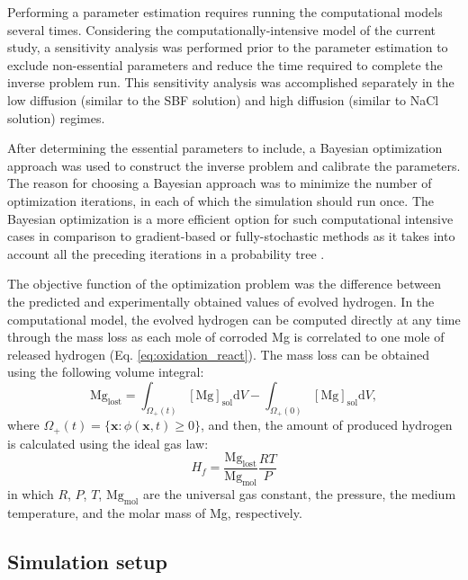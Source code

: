 Performing a parameter estimation requires running the computational models several times. Considering the computationally-intensive model of the current study, a sensitivity analysis was performed prior to the parameter estimation to exclude non-essential parameters and reduce the time required to complete the inverse problem run. This sensitivity analysis was accomplished separately in the low diffusion (similar to the {SBF} solution) and high diffusion (similar to NaCl solution) regimes.

After determining the essential parameters to include, a Bayesian optimization approach \cite{Mockus1989} was used to construct the inverse problem and calibrate the parameters. The reason for choosing a Bayesian approach was to minimize the number of optimization iterations, in each of which the simulation should run once. The Bayesian optimization is a more efficient option for such computational intensive cases in comparison to gradient-based or fully-stochastic methods as it takes into account all the preceding iterations in a probability tree \cite{Mehrian2017}.

The objective function of the optimization problem was the difference between the predicted and experimentally obtained values of evolved hydrogen. In the computational model, the evolved hydrogen can be computed directly at any time through the mass loss as each mole of corroded Mg is correlated to one mole of released hydrogen (Eq. \ref{eq:oxidation_react}). The mass loss can be obtained using the following volume integral:
\begin{equation} \label{eq:mass_loss}
\mathrm{Mg}_{\mathrm{lost}}=\int_{\Omega_{+}(t)} [\mathrm{Mg}]_{\mathrm{sol}} \mathrm{d} V-\int_{\Omega_{+}(0)} [\mathrm{Mg}]_{\mathrm{sol}} \mathrm{d} V,
\end{equation}
where $\Omega_{+}(t)=\{\mathbf{x}: \phi(\mathbf{x}, t) \geq 0\}$, and then, the amount of produced hydrogen is calculated using the ideal gas law:
\begin{equation} \label{eq:evolv_hydr}
H_{f}=\frac{\mathrm{Mg}_{\mathrm{lost}}}{\mathrm{Mg}_{\mathrm{mol}}} \frac{R T}{P}
\end{equation}
in which $R$, $P$, $T$, $\mathrm{Mg}_{\mathrm{mol}}$ are the universal gas constant, the pressure, the medium temperature, and  the molar mass of Mg, respectively.

\subsection{Simulation setup}



